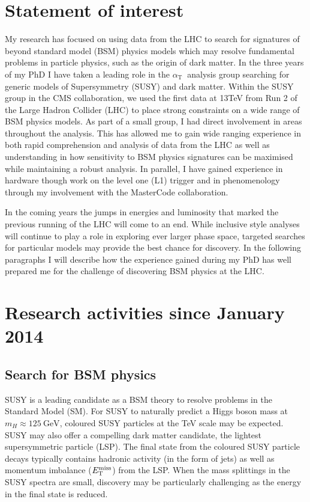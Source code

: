 \documentclass[11pt]{article}
\theoremstyle{plain} \numberwithin{equation}{section}
\theoremstyle{definition}
\DeclareRobustCommand{\alphat}{$\alpha_{\text{T}}~$}
\DeclareRobustCommand{\met}{$\mbox{$E_\text{T}^{\rm miss}$}\xspace$}
\begin{document}
\section*{Statement of interest}
\noindent 
My research has focused on using data from the LHC to search for signatures of beyond standard model (BSM) physics models which may resolve 
fundamental problems in particle physics, such as the origin of dark matter. 
In the three years of my PhD I have taken a leading role in the \alphat 
analysis group searching for generic models of Supersymmetry (SUSY) and dark matter. 
Within the SUSY group in the CMS collaboration, we used the first data at 13TeV from Run 2 of the 
Large Hadron Collider (LHC) to place strong constraints on a wide range of BSM physics models. As part of a small group, I had direct involvement 
in areas throughout the analysis. This has allowed me to gain wide ranging experience in both rapid comprehension
and analysis of data from the LHC as well as understanding in how sensitivity to BSM physics signatures can be maximised
while maintaining a robust analysis. In parallel, I have gained experience in hardware though work on the 
level one (L1) trigger and in phenomenology through my involvement with the MasterCode collaboration.

In the coming years the jumps in energies and luminosity that marked the previous running of the 
LHC will come to an end. While inclusive style analyses will continue to play a role in 
exploring ever larger phase space, targeted searches for particular models 
may provide the best chance for discovery. In the following paragraphs I will describe how the experience 
gained during my PhD has well prepared me for the challenge of discovering BSM physics at the LHC.

\section*{Research activities since January 2014}

\subsection*{Search for BSM physics}

SUSY is a leading candidate as a BSM theory to resolve problems in the Standard Model (SM).
For SUSY to naturally predict a Higgs boson mass at $m_H \approx 125~\text{GeV}$, coloured 
SUSY particles at the TeV scale may be expected. SUSY may also offer a compelling dark matter
candidate, the lightest supersymmetric particle (LSP). The final state from the coloured SUSY 
particle decays typically contains hadronic activity (in the form of jets) as well as momentum 
imbalance (\met) from the LSP. When the mass splittings in the SUSY spectra are small, 
discovery may be particularly challenging as the energy in the final state is reduced.
\end{document}
